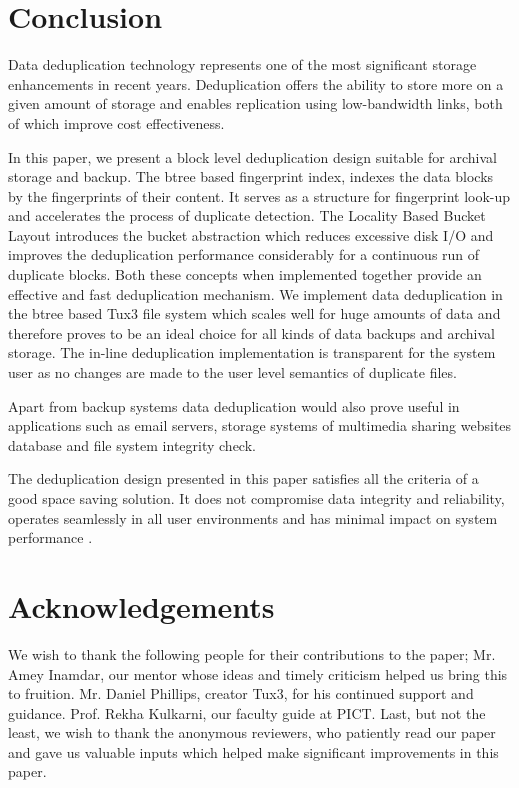 \documentclass[final]{ols}
\begin{document}
\section{Conclusion}
Data deduplication technology represents one of the most significant storage enhancements in recent years. Deduplication offers the ability to store more on a given amount of storage and enables replication using low-bandwidth links, both of which improve cost effectiveness. 

In this paper, we present a block level deduplication design suitable for archival storage and backup. The btree based fingerprint index, indexes the data blocks by the fingerprints of their content. It serves as a structure for fingerprint look-up and accelerates the process of duplicate detection. The Locality Based Bucket Layout introduces the bucket abstraction which reduces excessive disk I/O and improves the deduplication performance considerably for a continuous run of duplicate blocks. Both these concepts when implemented together provide an effective and fast deduplication mechanism. 
We implement data deduplication in the btree based Tux3 file system which scales well for huge amounts of data and therefore proves to be an ideal choice for all kinds of data backups and archival storage. The in-line deduplication implementation is transparent for the system user as no changes are made to the user level semantics of duplicate files. 

Apart from backup systems data deduplication would also prove useful in applications such as email servers, storage systems of multimedia sharing websites database and file system integrity check. 

The deduplication design presented in this paper satisfies all the criteria of a good space saving solution. It does not compromise data integrity and reliability, operates seamlessly in all user environments and has minimal impact on system performance .

\section{Acknowledgements}

We wish to thank the following people for their contributions to the paper; Mr. Amey Inamdar, our mentor whose ideas and timely criticism helped us bring this to fruition. Mr. Daniel Phillips, creator Tux3, for his continued support and guidance. Prof. Rekha Kulkarni, our faculty guide at PICT. Last, but not the least, we wish to thank the anonymous reviewers, who patiently read our paper and gave us valuable inputs which helped make significant improvements in this paper.
\end{document}
